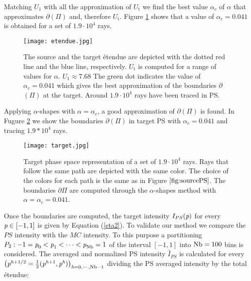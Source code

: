 Matching $U_1$ with all the approximation of $U_{\textrm{t}}$ we find the best value $\alpha_c$ of $\alpha$ that approximates $\partial$$(\Pi)$ and, therefore $U_{\textrm{t}}$. Figure \ref{fig:etendueTS} shows that a value of $\alpha_c = 0.041$ is obtained for a set of $1.9\cdot 10^4$ rays.
 \begin{figure}[h]
  \begin{center}
  \texttt{[image: etendue.jpg]}
  \end{center}
  \caption{\footnotesize{The source and the target \'{e}tendue are depicted with the dotted red line and the blue line, respectively.
  $U_\textrm{t}$ is computed for a range of values for $\alpha$. $U_1 \approx 7.68$
   The green dot indicates the value of $\alpha_c = 0.041$ which gives the best approximation of the boundaries $\partial$$(\Pi)$ at the target.
   Around $1.9 \cdot 10^4$ rays have been traced in PS.
  }}
  \label{fig:etendueTS}
\end{figure}
Applying $\alpha$-shapes with $\alpha=\alpha_c$, a good approximation of $\partial$$(\Pi)$ is found. In Fugure \ref{fig:targetPS} we show the boundaries 
$\partial$$(\Pi)$ in target PS  with $\alpha_c=0.041$ and tracing $1.9*10^4$ rays.
  \begin{figure}[h]
  \begin{center}
  \texttt{[image: target.jpg]}
  \end{center}
  \caption{\footnotesize{Target phase space representation of a set of $1.9 \cdot 10^4$ rays.
  Rays that follow the same path are depicted with the same color. The choice of the colors for each path is the same as in Figure $\ref{fig:sourcePS}$. The boundaries $\partial$$\Pi$ are computed through the $\alpha$-shapes method with $\alpha = \alpha_c = 0.041$.}}
  \label{fig:targetPS}
\end{figure}
Once the boundaries are computed, the target intensity $I_{PS}(\textit{p})$ for every $\textit{p}\in[-1,1]$ is given by Equation (\ref{eta2}). 
To validate our method we compare the $PS$ intensity with the $MC$ intensity. 
To this purpose a partitioning $P_2:-1=\textit{p}_{0}<\textit{p}_1<\cdots<\textit{p}_{\textrm{Nb}}=1$ of the interval $[-1,1]$ into $\textrm{Nb}=100$ bins is considered. 
The averaged and normalized PS intensity $\hat{I}_{PS}$ is calculated for every 
$\big(\textit{p}^{\textit{h}+1/2} = \frac{1}{2}(\textit{p}^{\textit{h}+1}, \textit{p}^{\textit{h}})\big)_{\textit{h}=0, \cdots, \textrm{Nb}-1}$ dividing the PS averaged intensity by the total \'{e}tendue:
